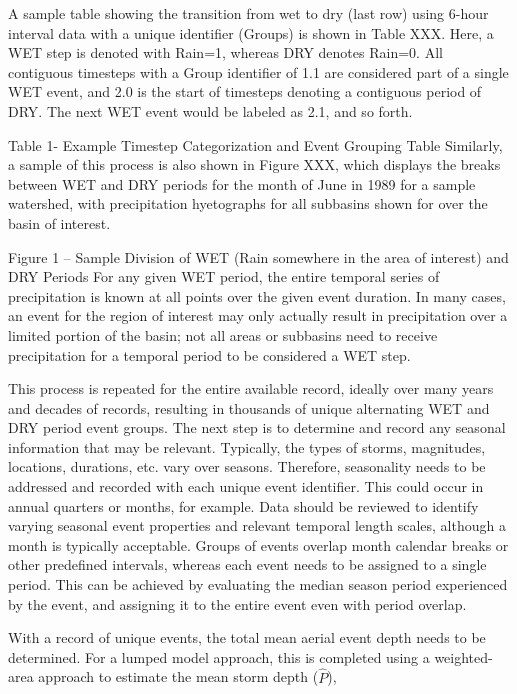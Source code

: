 \documentclass[11pt]{article} %
\begin{document}
A sample table showing the transition from wet to dry (last row) using 6-hour interval data with a unique identifier (Groups) is shown in Table XXX. Here, a WET step is denoted with Rain=1, whereas DRY denotes Rain=0. All contiguous timesteps with a Group identifier of 1.1 are considered part of a single WET event, and 2.0 is the start of timesteps denoting a contiguous period of DRY. The next WET event would be labeled as 2.1, and so forth.
 
Table 1- Example Timestep Categorization and Event Grouping Table
Similarly, a sample of this process is also shown in Figure XXX, which displays the breaks between WET and DRY periods for the month of June in 1989 for a sample watershed, with precipitation hyetographs for all subbasins shown for over the basin of interest.
 
Figure 1 – Sample Division of WET (Rain somewhere in the area of interest) and DRY Periods
For any given WET period, the entire temporal series of precipitation is known at all points over the given event duration. In many cases, an event for the region of interest may only actually result in precipitation over a limited portion of the basin; not all areas or subbasins need to receive precipitation for a temporal period to be considered a WET step.

This process is repeated for the entire available record, ideally over many years and decades of records, resulting in thousands of unique alternating WET and DRY period event groups. The next step is to determine and record any seasonal information that may be relevant. Typically, the types of storms, magnitudes, locations, durations, etc. vary over seasons. Therefore, seasonality needs to be addressed and recorded with each unique event identifier. This could occur in annual quarters or months, for example. Data should be reviewed to identify varying seasonal event properties and relevant temporal length scales, although a month is typically acceptable. Groups of events overlap month calendar breaks or other predefined intervals, whereas each event needs to be assigned to a single period. This can be achieved by evaluating the median season period experienced by the event, and assigning it to the entire event even with period overlap.

With a record of unique events, the total mean aerial event depth needs to be determined. For a lumped model approach, this is completed using a weighted-area approach to estimate the mean storm depth ($\hat P$),
\end{document}
